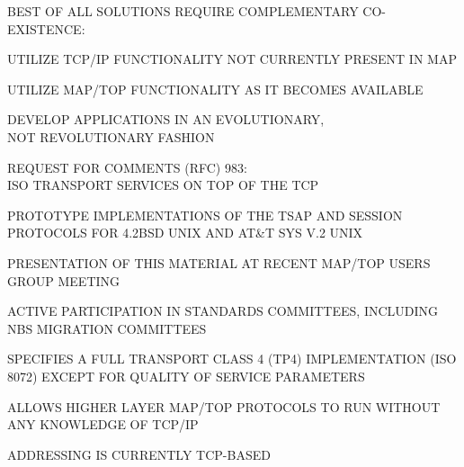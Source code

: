 \begin{bwslide}

\begin	{nrtc}
\item	BEST OF ALL SOLUTIONS REQUIRE COMPLEMENTARY CO-EXISTENCE:
	\begin	{nrtc}
	\item	UTILIZE TCP/IP FUNCTIONALITY NOT CURRENTLY PRESENT IN MAP
	\item	UTILIZE MAP/TOP FUNCTIONALITY AS IT BECOMES AVAILABLE
	\item	DEVELOP APPLICATIONS IN AN EVOLUTIONARY,\\
		NOT REVOLUTIONARY FASHION
	\end	{nrtc}
\end	{nrtc}
\end	{bwslide}

\begin{bwslide}
\vskip-0.5in
\end	{bwslide}

\begin{bwslide}

\begin	{nrtc}
\item 	REQUEST FOR COMMENTS (RFC) 983:\\
	ISO TRANSPORT SERVICES ON TOP OF THE TCP
\item 	PROTOTYPE IMPLEMENTATIONS OF THE TSAP AND SESSION
	PROTOCOLS FOR 4.2BSD UNIX AND AT\&T SYS V.2 UNIX
\item	PRESENTATION OF THIS MATERIAL AT RECENT MAP/TOP USERS GROUP MEETING
\item	ACTIVE PARTICIPATION IN STANDARDS COMMITTEES, INCLUDING NBS
	MIGRATION COMMITTEES
\end	{nrtc}
\end	{bwslide}

\begin{bwslide}

\begin	{nrtc}
\item	SPECIFIES A FULL TRANSPORT CLASS 4 (TP4) IMPLEMENTATION (ISO 8072)
	EXCEPT FOR QUALITY OF SERVICE PARAMETERS
\item	ALLOWS HIGHER LAYER MAP/TOP PROTOCOLS TO RUN WITHOUT ANY
	KNOWLEDGE OF TCP/IP
\item	ADDRESSING IS CURRENTLY TCP-BASED
\end	{nrtc}
\end	{bwslide}

